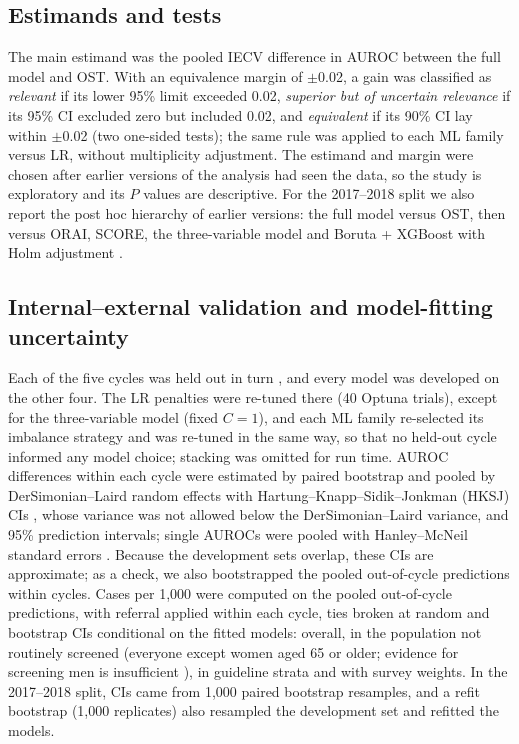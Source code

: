 \documentclass[11pt,a4paper]{article}
\begin{document}
\subsection{Estimands and tests}
The main estimand was the pooled IECV difference in AUROC between the full model and OST. With an equivalence margin of $\pm$0.02, a gain was classified as \emph{relevant} if its lower 95\% limit exceeded 0.02, \emph{superior but of uncertain relevance} if its 95\% CI excluded zero but included 0.02, and \emph{equivalent} if its 90\% CI lay within $\pm$0.02 (two one-sided tests); the same rule was applied to each ML family versus LR, without multiplicity adjustment. The estimand and margin were chosen after earlier versions of the analysis had seen the data, so the study is exploratory and its $P$ values are descriptive. For the 2017--2018 split we also report the post hoc hierarchy of earlier versions: the full model versus OST, then versus ORAI, SCORE, the three-variable model and Boruta + XGBoost with Holm adjustment \cite{holm1979}.

\subsection{Internal--external validation and model-fitting uncertainty}
Each of the five cycles was held out in turn \cite{steyerberg2016}, and every model was developed on the other four. The LR penalties were re-tuned there (40 Optuna trials), except for the three-variable model (fixed $C=1$), and each ML family re-selected its imbalance strategy and was re-tuned in the same way, so that no held-out cycle informed any model choice; stacking was omitted for run time. AUROC differences within each cycle were estimated by paired bootstrap and pooled by DerSimonian--Laird random effects \cite{dersimonian1986} with Hartung--Knapp--Sidik--Jonkman (HKSJ) CIs \cite{inthout2014}, whose variance was not allowed below the DerSimonian--Laird variance, and 95\% prediction intervals; single AUROCs were pooled with Hanley--McNeil standard errors \cite{hanley1982}. Because the development sets overlap, these CIs are approximate; as a check, we also bootstrapped the pooled out-of-cycle predictions within cycles. Cases per 1,000 were computed on the pooled out-of-cycle predictions, with referral applied within each cycle, ties broken at random and bootstrap CIs conditional on the fitted models: overall, in the population not routinely screened (everyone except women aged 65 or older; evidence for screening men is insufficient \cite{uspstf2025}), in guideline strata and with survey weights. In the 2017--2018 split, CIs came from 1,000 paired bootstrap resamples, and a refit bootstrap (1,000 replicates) also resampled the development set and refitted the models.
\end{document}
